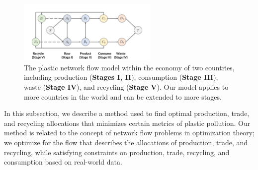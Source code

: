 
\begin{figure}
    \centering
    \includegraphics[width=0.6\textwidth]{figures/data-open-flow-model.pdf}
    \caption{The plastic network flow model within the economy of two countries, including production (\textbf{Stages I, II}), consumption (\textbf{Stage III}), waste (\textbf{Stage IV}), and recycling (\textbf{Stage V}). Our model applies to more countries in the world and can be extended to more stages.}
    \label{fig:flow-model}
\end{figure}

In this subsection, we describe a method used to find optimal production, trade, and recycling allocations that minimizes certain metrics of plastic pollution. Our method is related to the concept of network flow problems in optimization theory; we optimize for the flow that describes the allocations of production, trade, and recycling, while satisfying constraints on production, trade, recycling, and consumption based on real-world data.  

